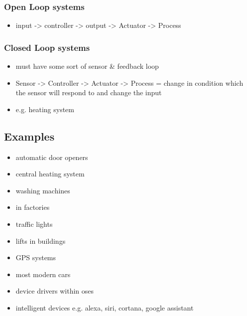 \documentclass[11pt]{article}
\begin{document}
\subsubsection{Open Loop systems}
\label{sec:org6823171}
\begin{itemize}
\item input -> controller -> output -> Actuator -> Process
\end{itemize}
\subsubsection{Closed Loop systems}
\label{sec:orge14acfa}
\begin{itemize}
\item must have some sort of sensor \& feedback loop
\item Sensor -> Controller -> Actuator -> Process = change in condition which the sensor will respond to and change the input
\item e.g. heating system
\end{itemize}
\subsection{Examples}
\label{sec:org697541e}
\begin{itemize}
\item automatic door openers
\item central heating system
\item washing machines
\item in factories
\item traffic lights
\item lifts in buildings
\item GPS systems
\item most modern cars
\item device drivers within oses
\item intelligent devices e.g. alexa, siri, cortana, google assistant
\end{itemize}
\end{document}
